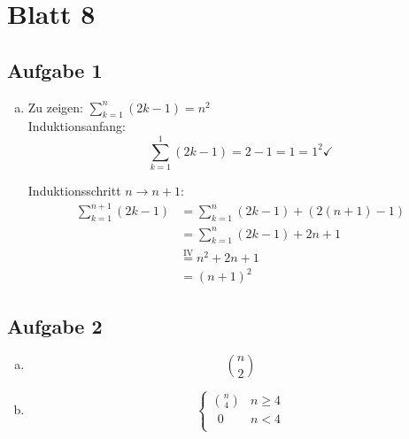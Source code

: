 \section*{Blatt 8}
%

\subsection*{Aufgabe 1}
\begin{enumerate}[a)]
\item Zu zeigen: $  \sum_{k=1}^n (2k-1) = n^2 $\\[1em]
Induktionsanfang: \[ \sum_{k=1}^1 (2k-1) = 2-1 = 1 = 1^2 \checkmark \]


Induktionsschritt $n \to n+1$:
\begin{align*}
\sum_{k=1}^{n+1} (2k-1) &= \sum_{k=1}^n (2k-1) + (2(n+1) -1) \\
                        &= \sum_{k=1}^n (2k-1) + 2 n +1 \\
                        &\stackrel{\text{IV}}{=} n^2 + 2n + 1\\
                        &= (n+1)^2
\end{align*}

\end{enumerate}

\subsection*{Aufgabe 2}
\begin{enumerate}[a)]
\item \[\binom{n}{2}\]
\item \[\begin{cases} \binom{n}{4} & n\geq 4 \\
              \; \, 0 & n < 4  \\
              \end{cases} \]

\end{enumerate}


